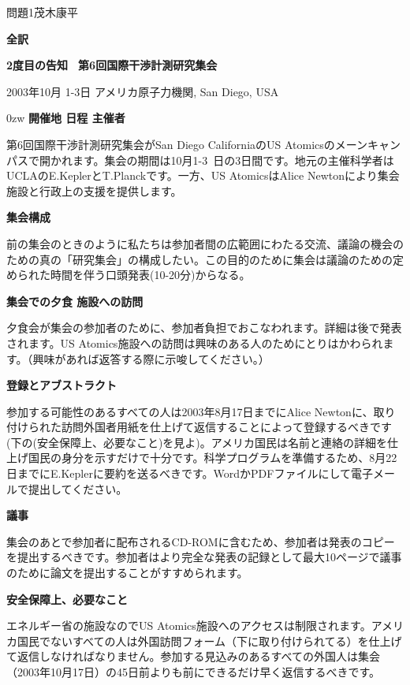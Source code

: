 \documentclass[fleqn]{jbook}
\begin{document}

\begin{answer}{問題1}{茂木康平}
\setcounter{equation}{0}

{\bf \noindent 全訳}

\begin{center}
    \bf 2度目の告知 \, 第6回国際干渉計測研究集会

    2003年10月 1-3日  アメリカ原子力機関, San Diego, USA
\end{center}

{\parindent 0zw
{\bf 開催地 日程 主催者}

第6回国際干渉計測研究集会がSan Diego CaliforniaのUS Atomicsのメーンキャンパスで開かれます。集会の期間は10月1-3~日の3日間です。地元の主催科学者はUCLAのE.KeplerとT.Planckです。一方、US AtomicsはAlice Newtonにより集会施設と行政上の支援を提供します。

{\bf 集会構成}

前の集会のときのように私たちは参加者間の広範囲にわたる交流、議論の機会のための真の「研究集会」の構成したい。この目的のために集会は議論のための定められた時間を伴う口頭発表(10-20分)からなる。

{\bf 集会での夕食 施設への訪問}

夕食会が集会の参加者のために、参加者負担でおこなわれます。詳細は後で発表されます。US Atomics施設への訪問は興味のある人のためにとりはかわられます。（興味があれば返答する際に示唆してください。）

{\bf 登録とアブストラクト}

参加する可能性のあるすべての人は2003年8月17日までにAlice Newtonに、取り付けられた訪問外国者用紙を仕上げて返信することによって登録するべきです(下の(安全保障上、必要なこと)を見よ)。アメリカ国民は名前と連絡の詳細を仕上げ国民の身分を示すだけで十分です。科学プログラムを準備するため、8月22日までにE.Keplerに要約を送るべきです。WordかPDFファイルにして電子メールで提出してください。

{\bf 議事}

集会のあとで参加者に配布されるCD-ROMに含むため、参加者は発表のコピーを提出するべきです。参加者はより完全な発表の記録として最大10ページで議事のために論文を提出することがすすめられます。

{\bf 安全保障上、必要なこと}

エネルギー省の施設なのでUS Atomics施設へのアクセスは制限されます。アメリカ国民でないすべての人は外国訪問フォーム（下に取り付けられてる）を仕上げて返信しなければなりません。参加する見込みのあるすべての外国人は集会（2003年10月17日）の45日前よりも前にできるだけ早く返信するべきです。

}
\end{answer}
\end{document}
